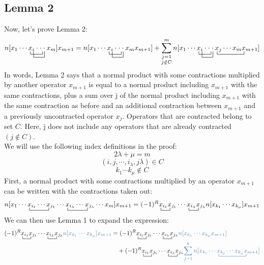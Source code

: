\documentclass{article}
\newcommand{\ctr}{\bcontraction}
\newcommand{\cd}{\ensuremath{\cdots} }
\def\cb#1{{\color{blue}#1}}
\begin{document}
\subsection{Lemma 2}
Now, let's prove Lemma 2:
\[n[\ctr{x_1 \cd}{x}{{}_i \cdot}{\cdot}
\ctr[2ex]{x_1 \cd x }{{}_i }{\cdot \cdot}{\cdot}
x_1 \cd x_i \cdot \cdot \cdot x_m]x_{m+1}  = 
n[\ctr{x_1 \cd}{x}{{}_i \cdot}{\cdot}
\ctr[2ex]{x_1 \cd x }{{}_i }{\cdot \cdot}{\cdot}
x_1 \cd x_i \cdot \cdot \cdot x_m x_{m+1} ] + 
\sum_{\substack{j = 1 \\ j \notin C}}^m n[\ctr{x_1 \cd}{x}{{}_i \cdot}{\cdot}
\ctr[2ex]{x_1 \cd x }{{}_i }{\cdot \cdot}{\cdot}
\ctr{x_1 \cd x_i \cdot \cdot \cdot }{x}{{}_j \cd  x_m }{x}
x_1 \cd x_i \cdot \cdot \cdot x_j \cd x_m x_{m+1} ] 
\]
In words, Lemma 2 says that a normal product with some contractions multiplied by another operator $x_{m+1}$ is equal to 
a normal product including $x_{m+1}$ with the same contractions, plus a sum over j of the normal product including $x_{m+1}$ with the same contraction as before 
and an additional contraction between $x_{m+1}$ and a previously uncontracted operator $x_j$. 
Operators that are contracted belong to set $C$. 
Here, j does not include any operators that are already contracted $(j \notin C)$. 
\\
We will use the following index definitions in the proof: 
\[2\lambda + \mu = m\]
\[(i, j, \cd, i_\lambda, j\lambda) \in C\]
\[k_1 \cd k_\mu \notin C\]
First, a normal product with some contractions multiplied by an operator $x_{m+1}$ can be written
with the contractions taken out:
\[n[x_1 \cd \ctr{}{x}{{}_{i_1} \cd }{x}   x_{i_1} \cd  x_{j_1} \cd   \ctr{}{x}{{}_{i_\lambda} \cd }{x} x_{i_\lambda} \cd   x_{j_\lambda} \cd x_m]x_{m + 1} 
= (-1)^R \ctr{}{x}{{}_{i_1}}{x}  x_{i_1} x_{j_1}  \cd \ctr{}{x}{{}_{i_\lambda}}{x} x_{i_\lambda}  x_{j_\lambda} n[x_{k_1} \cd x_{k_\mu}] x_{m+1} \]
We can then use Lemma 1 to expand the expression: 
\begin{align*}
(-1)^R \ctr{}{x}{{}_{i_1}}{x}  x_{i_1} x_{j_1}  \cd \ctr{}{x}{{}_{i_\lambda}}{x} x_{i_\lambda}  x_{j_\lambda} \cb{n[x_{k_1} \cd x_{k_\mu}] x_{m+1}}
&= (-1)^R \ctr{}{x}{{}_{i_1}}{x}  x_{i_1} x_{j_1}  \cd \ctr{}{x}{{}_{i_\lambda}}{x} x_{i_\lambda}  x_{j_\lambda} \cb{n[x_{k_1} \cd x_{k_\mu}x_{m+1}] } \\
&\quad + (-1)^R \ctr{}{x}{{}_{i_1}}{x}  x_{i_1} x_{j_1}  \cd \ctr{}{x}{{}_{i_\lambda}}{x} x_{i_\lambda}  x_{j_\lambda}\cb{ \sum_{j=1}^k n[x_{k_1} \cd \ctr{}{x}{{}_{k_j} \cd  x_{k_\mu}}{x} x_{k_j} \cd x_{k_\mu}x_{m+1} ] } \\
\end{align*}
\end{document}
